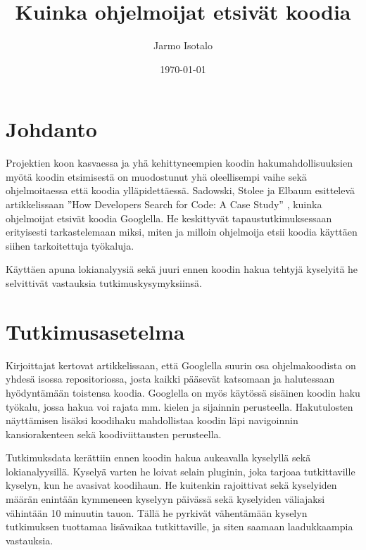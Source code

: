 \documentclass[finnish]{../tktltiki2}
\title{Kuinka ohjelmoijat etsivät koodia}
\author{Jarmo Isotalo}
\date{\today}
\theoremstyle{definition}
\theoremstyle{remark}
\begin{document}

\frontmatter      %

\maketitle        %

\tableofcontents  %


\mainmatter       %

\section{Johdanto}

Projektien koon kasvaessa ja yhä kehittyneempien koodin hakumahdollisuuksien myötä koodin etsimisestä on muodostunut yhä oleellisempi vaihe sekä ohjelmoitaessa että koodia ylläpidettäessä. Sadowski, Stolee ja Elbaum esittelevä artikkelissaan ''How Developers Search for Code: A Case Study'' \cite{g_search_code}, kuinka ohjelmoijat etsivät koodia Googlella.
He keskittyvät tapaustutkimuksessaan erityisesti tarkastelemaan miksi, miten ja milloin ohjelmoija etsii koodia käyttäen siihen tarkoitettuja työkaluja.

Käyttäen apuna lokianalyysiä sekä juuri ennen koodin hakua tehtyjä kyselyitä he selvittivät vastauksia tutkimuskysymyksiinsä.

\section{Tutkimusasetelma}

Kirjoittajat kertovat artikkelissaan, että Googlella suurin osa ohjelmakoodista on yhdesä isossa repositoriossa, josta kaikki pääsevät katsomaan ja halutessaan hyödyntämään toistensa koodia. Googlella on myös käytössä sisäinen koodin haku työkalu, jossa hakua voi rajata mm. kielen ja sijainnin perusteella. Hakutulosten näyttämisen lisäksi koodihaku mahdollistaa koodin läpi navigoinnin kansiorakenteen sekä koodiviittausten perusteella. %

Tutkimuksdata kerättiin ennen koodin hakua aukeavalla kyselyllä sekä lokianalyysillä.
Kyselyä varten he loivat selain pluginin, joka tarjoaa tutkittaville kyselyn, kun he avasivat koodihaun. He kuitenkin rajoittivat sekä kyselyiden määrän enintään kymmeneen kyselyyn päivässä sekä kyselyiden väliajaksi vähintään 10 minuutin tauon. Tällä he pyrkivät vähentämään kyselyn tutkimuksen tuottamaa lisävaikaa tutkittaville, ja siten saamaan laadukkaampia vastauksia.
\end{document}
